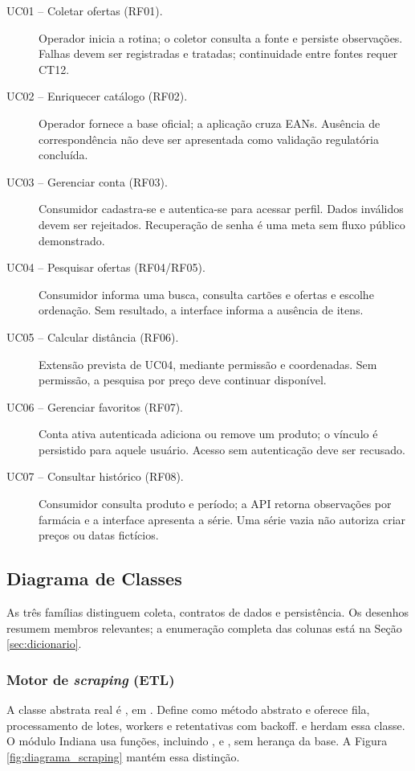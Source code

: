 \begin{description}
\item[UC01 -- Coletar ofertas (RF01).] Operador inicia a rotina; o coletor consulta a fonte e persiste observações. Falhas devem ser registradas e tratadas; continuidade entre fontes requer CT12.
\item[UC02 -- Enriquecer catálogo (RF02).] Operador fornece a base oficial; a aplicação cruza EANs. Ausência de correspondência não deve ser apresentada como validação regulatória concluída.
\item[UC03 -- Gerenciar conta (RF03).] Consumidor cadastra-se e autentica-se para acessar perfil. Dados inválidos devem ser rejeitados. Recuperação de senha é uma meta sem fluxo público demonstrado.
\item[UC04 -- Pesquisar ofertas (RF04/RF05).] Consumidor informa uma busca, consulta cartões e ofertas e escolhe ordenação. Sem resultado, a interface informa a ausência de itens.
\item[UC05 -- Calcular distância (RF06).] Extensão prevista de UC04, mediante permissão e coordenadas. Sem permissão, a pesquisa por preço deve continuar disponível.
\item[UC06 -- Gerenciar favoritos (RF07).] Conta ativa autenticada adiciona ou remove um produto; o vínculo é persistido para aquele usuário. Acesso sem autenticação deve ser recusado.
\item[UC07 -- Consultar histórico (RF08).] Consumidor consulta produto e período; a API retorna observações por farmácia e a interface apresenta a série. Uma série vazia não autoriza criar preços ou datas fictícios.
\end{description}

\subsection{Diagrama de Classes}

As três famílias distinguem coleta, contratos de dados e persistência. Os desenhos resumem membros relevantes; a enumeração completa das colunas está na Seção \ref{sec:dicionario}.

\subsubsection{Motor de \textit{scraping} (ETL)}

A classe abstrata real é , em . Define  como método abstrato e oferece fila, processamento de lotes, workers e retentativas com backoff.  e  herdam essa classe. O módulo Indiana usa funções, incluindo ,  e , sem herança da base. A Figura \ref{fig:diagrama_scraping} mantém essa distinção.

